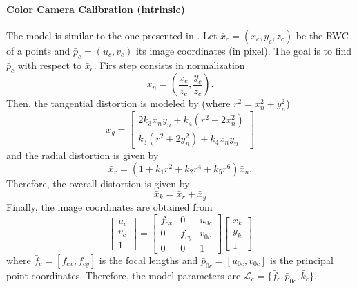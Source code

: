 \documentclass[11pt,a4paper]{article}
\begin{document}
\paragraph{Color Camera Calibration (intrinsic)} The model is similar to the one presented in \cite{Heikkila1997}. Let $\bar{x}_c =(x_c,y_c,z_c)$ be the RWC of a points and $\bar{p}_c = (u_c,v_c)$ its image coordinates (in pixel). The goal is to find $\bar{p}_c$ with respect to $\bar{x}_c$. Firs step consists in normalization
\begin{equation}
\bar{x}_n = \left( \frac{x_c}{z_c},\frac{y_c}{z_c}\right).
\end{equation}
Then, the tangential distortion is modeled by (where $r^2 = x_n^2+y_n^2$)
\begin{equation}
\bar{x}_g =
\left[
\begin{array}{c}
2k_3x_ny_n+k_4(r^2+2x_n^2) \\
k_3(r^2+2y_n^2)+ k_4x_ny_n
\end{array}
\right]
\end{equation}
and the radial distortion is given by
\begin{equation}
\bar{x}_r = (1+k_1r^2 + k_2r^4 + k_5r^6)\bar{x}_n.
\end{equation}
Therefore, the overall distortion is given by
\begin{equation}
\bar{x}_k = \bar{x}_r + \bar{x}_g
\end{equation}
Finally, the image coordinates are obtained from
\begin{equation}
\left[
\begin{array}{c}
u_c \\
v_c \\
1
\end{array}
\right]
=
\left[
\begin{array}{ccc}
f_{cx} & 0 & u_{0c} \\
0 & f_{cy} & v_{0c} \\
0 & 0 & 1
\end{array}
\right]
\left[
\begin{array}{c}
x_k \\
y_k \\
1
\end{array}
\right]
\end{equation}
where $\bar{f}_c = [f_{cx},f_{cy}]$ is the focal lengths and $\bar{p}_{0c} = [u_{0c},v_{0c}]$ is the principal point coordinates. Therefore, the model parameters are $\mathcal{L}_c = \{\bar{f}_c,\bar{p}_{0c},\bar{k}_c\}$.
\end{document}
